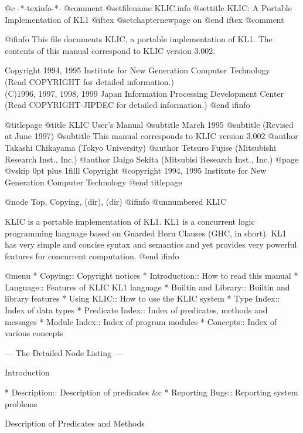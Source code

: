   @c -*-texinfo-*-
@comment %
@setfilename KLIC.info
@settitle KLIC: A Portable Implementation of KL1
@iftex
@setchapternewpage on
@end iftex
@comment %

@ifinfo
This file documents KLIC, a portable implementation of KL1.
The contents of this manual correspond to KLIC version 3.002.

Copyright 1994, 1995 Institute for New Generation Computer Technology\\
(Read COPYRIGHT for detailed information.)\\
(C)1996, 1997, 1998, 1999 Japan Information Processing Development Center\\
(Read COPYRIGHT-JIPDEC for detailed information.)
@end ifinfo

@titlepage
@title KLIC User's Manual
@subtitle March 1995
@subtitle (Revised at June 1997)
@subtitle This manual corresponds to KLIC version 3.002
@author Takashi Chikayama (Tokyo University)
@author Tetsuro Fujise (Mitsubishi Research Inst., Inc.)
@author Daigo Sekita (Mitsubisi Research Inst., Inc.)
@page
@vskip 0pt plus 1filll
Copyright @copyright{} 1994, 1995 Institute for New Generation Computer Technology
@end titlepage

@node Top, Copying, (dir), (dir)
@ifinfo
@unnumbered KLIC

KLIC is a portable implementation of KL1.  KL1 is a concurrent logic
programming language based on Guarded Horn Clauses (GHC, in short).
KL1 has very simple and concise syntax and semantics and yet provides
very powerful features for concurrent computation.
@end ifinfo

@menu
* Copying::                     Copyright notices
* Introduction::                How to read this manual
* Language::                    Features of KLIC KL1 language
* Builtin and Library::         Builtin and library features
* Using KLIC::                  How to use the KLIC system
* Type Index::                  Index of data types
* Predicate Index::             Index of predicates, methods and messages
* Module Index::                Index of program modules
* Concepts::                    Index of various concepts

 --- The Detailed Node Listing ---

Introduction

* Description::                 Description of predicates &c
* Reporting Bugs::              Reporting system problems

Description of Predicates and Methods

